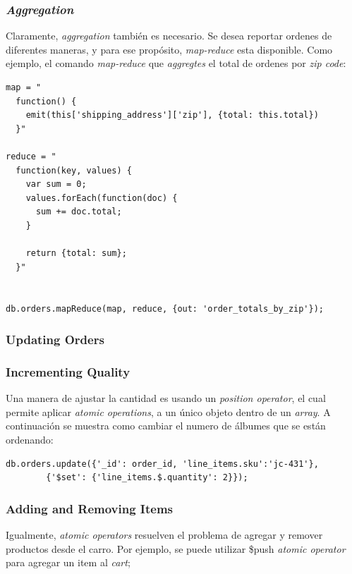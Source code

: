 \subsubsection{\textit{Aggregation}}

Claramente, \textit{aggregation} también es necesario. Se desea reportar ordenes de diferentes maneras, y para ese propósito, \textit{map-reduce} esta disponible. Como ejemplo, el comando \textit{map-reduce} que \textit{aggregtes} el total de ordenes por \textit{zip code}:

\begin{lstlisting}[caption= Ejemplo de commando \textit{map-reduce}.]
map = "
  function() {
    emit(this['shipping_address']['zip'], {total: this.total})
  }"

reduce = "
  function(key, values) {
    var sum = 0;
    values.forEach(function(doc) {
      sum += doc.total;
    }

    return {total: sum};
  }"


db.orders.mapReduce(map, reduce, {out: 'order_totals_by_zip'});
\end{lstlisting}

\subsubsection{Updating Orders}

\subsubsection*{Incrementing Quality}

Una manera de ajustar la cantidad es usando un \textit{position operator}, el cual permite aplicar \textit{atomic operations}, a un único objeto dentro de un \textit{array}. A continuación se muestra como cambiar el numero de álbumes que se están ordenando:

\begin{lstlisting}[caption= Ejemplo de \textit{atomic operation}.]
	db.orders.update({'_id': order_id, 'line_items.sku':'jc-431'},
		{'$set': {'line_items.$.quantity': 2}});
\end{lstlisting}

 
\subsubsection*{Adding and Removing Items}

Igualmente, \textit{atomic operators} resuelven el problema de agregar y remover productos desde el carro. Por ejemplo, se puede utilizar \$push \textit{atomic operator} para agregar un item al \textit{cart};

